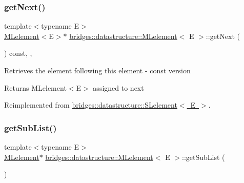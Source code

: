\subsubsection{\texorpdfstring{getNext()}{getNext()}\hspace{0.1cm}{\footnotesize\ttfamily [2/2]}}
{\footnotesize\ttfamily template$<$typename E$>$ \\
\mbox{\hyperlink{classbridges_1_1datastructure_1_1_m_lelement}{M\+Lelement}}$<$E$>$$\ast$ \mbox{\hyperlink{classbridges_1_1datastructure_1_1_m_lelement}{bridges\+::datastructure\+::\+M\+Lelement}}$<$ E $>$\+::get\+Next (\begin{DoxyParamCaption}{ }\end{DoxyParamCaption}) const\hspace{0.3cm}{\ttfamily [inline]}, {\ttfamily [override]}, {\ttfamily [virtual]}}

Retrieves the element following this element -\/ const version

\begin{DoxyReturn}{Returns}
M\+Lelement$<$\+E$>$ assigned to next 
\end{DoxyReturn}


Reimplemented from \mbox{\hyperlink{classbridges_1_1datastructure_1_1_s_lelement_a8c62cb82fa64bbfe9ebb7334a5fea417}{bridges\+::datastructure\+::\+S\+Lelement$<$ E $>$}}.

\mbox{\label{classbridges_1_1datastructure_1_1_m_lelement_a9faeb30ffd023746ce36e05705a62b2d}} 
\subsubsection{\texorpdfstring{getSubList()}{getSubList()}}
{\footnotesize\ttfamily template$<$typename E$>$ \\
\mbox{\hyperlink{classbridges_1_1datastructure_1_1_m_lelement}{M\+Lelement}}$\ast$ \mbox{\hyperlink{classbridges_1_1datastructure_1_1_m_lelement}{bridges\+::datastructure\+::\+M\+Lelement}}$<$ E $>$\+::get\+Sub\+List (\begin{DoxyParamCaption}{ }\end{DoxyParamCaption})\hspace{0.3cm}{\ttfamily [inline]}}

